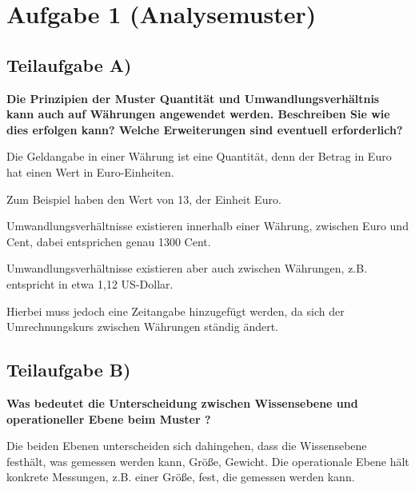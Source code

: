 \section{Aufgabe 1 (Analysemuster)}

\subsection{Teilaufgabe A)}
\textbf{Die Prinzipien der Muster Quantität und Umwandlungsverhältnis kann auch auf
Währungen angewendet werden. Beschreiben Sie wie dies erfolgen kann? Welche
Erweiterungen sind eventuell erforderlich?}

Die Geldangabe in einer Währung ist eine Quantität, denn der Betrag in \zB Euro
hat einen Wert in Euro-Einheiten. 

Zum Beispiel  haben den Wert von 13, der Einheit Euro.

Umwandlungsverhältnisse existieren innerhalb einer Währung, \zB zwischen Euro
und Cent, dabei entsprichen  genau 1300 Cent. 

Umwandlungsverhältnisse existieren aber auch zwischen Währungen, z.B.
entspricht  in etwa 1,12 US-Dollar. 

Hierbei muss jedoch eine Zeitangabe hinzugefügt werden, da sich der
Umrechnungskurs zwischen Währungen ständig ändert.

\subsection{Teilaufgabe B)}
\textbf{Was bedeutet die Unterscheidung zwischen Wissensebene und operationeller Ebene
beim Muster ?}

Die beiden Ebenen unterscheiden sich dahingehen, dass die Wissensebene
festhält, was gemessen werden kann, \zB Größe, Gewicht. Die operationale Ebene
hält konkrete Messungen, z.B. einer Größe, fest, die gemessen werden kann.
\clearpage
